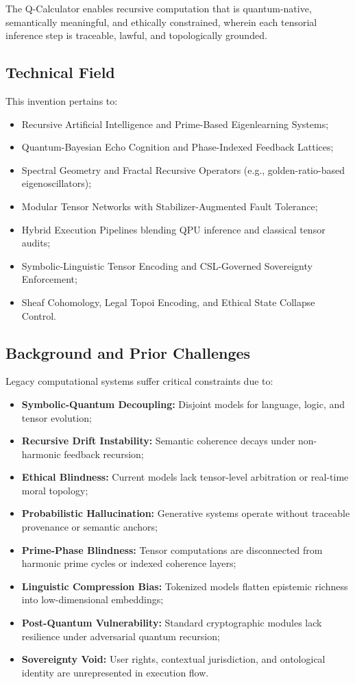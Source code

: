 \documentclass[12pt]{article}
\begin{document}
The Q-Calculator enables recursive computation that is quantum-native, semantically meaningful, and ethically constrained, wherein each tensorial inference step is traceable, lawful, and topologically grounded.

\subsection*{Technical Field}

This invention pertains to:

\begin{itemize}
    \item Recursive Artificial Intelligence and Prime-Based Eigenlearning Systems;
    \item Quantum-Bayesian Echo Cognition and Phase-Indexed Feedback Lattices;
    \item Spectral Geometry and Fractal Recursive Operators (e.g., golden-ratio-based eigenoscillators);
    \item Modular Tensor Networks with Stabilizer-Augmented Fault Tolerance;
    \item Hybrid Execution Pipelines blending QPU inference and classical tensor audits;
    \item Symbolic-Linguistic Tensor Encoding and CSL-Governed Sovereignty Enforcement;
    \item Sheaf Cohomology, Legal Topoi Encoding, and Ethical State Collapse Control.
\end{itemize}

\subsection*{Background and Prior Challenges}

Legacy computational systems suffer critical constraints due to:

\begin{itemize}
    \item \textbf{Symbolic-Quantum Decoupling:} Disjoint models for language, logic, and tensor evolution;
    \item \textbf{Recursive Drift Instability:} Semantic coherence decays under non-harmonic feedback recursion;
    \item \textbf{Ethical Blindness:} Current models lack tensor-level arbitration or real-time moral topology;
    \item \textbf{Probabilistic Hallucination:} Generative systems operate without traceable provenance or semantic anchors;
    \item \textbf{Prime-Phase Blindness:} Tensor computations are disconnected from harmonic prime cycles or indexed coherence layers;
    \item \textbf{Linguistic Compression Bias:} Tokenized models flatten epistemic richness into low-dimensional embeddings;
    \item \textbf{Post-Quantum Vulnerability:} Standard cryptographic modules lack resilience under adversarial quantum recursion;
    \item \textbf{Sovereignty Void:} User rights, contextual jurisdiction, and ontological identity are unrepresented in execution flow.
\end{itemize}
\end{document}
